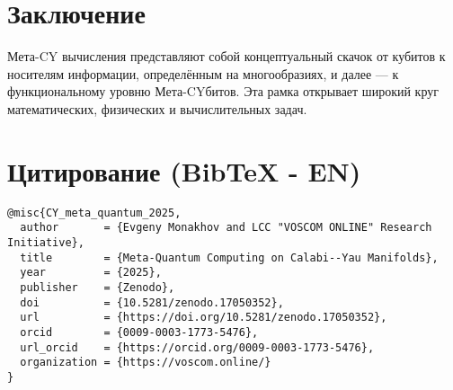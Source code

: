 \documentclass[12pt,a4paper]{article}
\begin{document}
\section{Заключение}
Мета-CY вычисления представляют собой концептуальный скачок 
от кубитов к носителям информации, определённым на многообразиях, 
и далее — к функциональному уровню Мета-CYбитов.  
Эта рамка открывает широкий круг математических, физических 
и вычислительных задач.  

\section*{Цитирование (BibTeX - EN)}
\begin{verbatim}
@misc{CY_meta_quantum_2025,
  author       = {Evgeny Monakhov and LCC "VOSCOM ONLINE" Research Initiative},
  title        = {Meta-Quantum Computing on Calabi--Yau Manifolds},
  year         = {2025},
  publisher    = {Zenodo},
  doi          = {10.5281/zenodo.17050352},
  url          = {https://doi.org/10.5281/zenodo.17050352},
  orcid        = {0009-0003-1773-5476},
  url_orcid    = {https://orcid.org/0009-0003-1773-5476},
  organization = {https://voscom.online/}
}
\end{verbatim}
\end{document}
